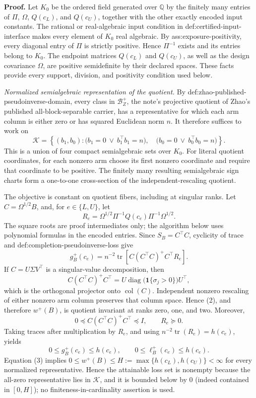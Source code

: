 \textbf{Proof.}
Let \(K_0\) be the ordered field generated over \(\mathbb Q\) by the finitely many entries of \(\Pi\), \(\Omega\), \(Q(c_L)\), and \(Q(c_U)\), together with the other exactly encoded input constants.  The rational or real-algebraic input condition in def:certified-input-interface makes every element of \(K_0\) real algebraic.  By ass:exposure-positivity, every diagonal entry of \(\Pi\) is strictly positive.  Hence \(\Pi^{-1}\) exists and its entries belong to \(K_0\).  The endpoint matrices \(Q(c_L)\) and \(Q(c_U)\), as well as the design covariance \(\Omega\), are positive semidefinite by their declared spaces.  These facts provide every support, division, and positivity condition used below.

\emph{Normalized semialgebraic representation of the quotient.}
By def:zhao-published-pseudoinverse-domain, every class in \(\mathcal B_Z^+\), the note's projective quotient of Zhao's published all-block-separable carrier, has a representative for which each arm column is either zero or has squared Euclidean norm \(n\).  It therefore suffices to work on
\[
\mathcal K=
\left\{(b_1,b_0):
\bigl(b_1=0\ \vee\ b_1^{\top}b_1=n\bigr),\quad
\bigl(b_0=0\ \vee\ b_0^{\top}b_0=n\bigr)
\right\}.
\tag{1}
\]
This is a union of four compact semialgebraic sets over \(K_0\).  For literal quotient coordinates, for each nonzero arm choose its first nonzero coordinate and require that coordinate to be positive.  The finitely many resulting semialgebraic sign charts form a one-to-one cross-section of the independent-rescaling quotient.

The objective is constant on quotient fibers, including at singular ranks.  Let \(C=\Omega^{1/2}B\), and, for \(e\in\{L,U\}\), let
\[
R_e=\Omega^{1/2}\Pi^{-1}Q(c_e)\Pi^{-1}\Omega^{1/2}.
\]
The square roots are proof intermediates only; the algorithm below uses polynomial formulas in the encoded entries.  Since \(S_B=C^{\top}C\), cyclicity of trace and def:completion-pseudoinverse-loss give
\[
g_B^+(c_e)
=n^{-2}\operatorname{tr}\!\left[
C(C^{\top}C)^+C^{\top}R_e
\right].
\tag{2}
\]
If \(C=U\Sigma V^{\top}\) is a singular-value decomposition, then
\[
C(C^{\top}C)^+C^{\top}
=U\operatorname{diag}\!\bigl(\mathbf 1\{\sigma_j>0\}\bigr)U^{\top},
\]
which is the orthogonal projector onto \(\operatorname{col}(C)\).  Independent nonzero rescaling of either nonzero arm column preserves that column space.  Hence (2), and therefore \(w^+(B)\), is quotient invariant at ranks zero, one, and two.  Moreover,
\[
0\preceq C(C^{\top}C)^+C^{\top}\preceq I,
\qquad R_e\succeq0.
\]
Taking traces after multiplication by \(R_e\), and using \(n^{-2}\operatorname{tr}(R_e)=h(c_e)\), yields
\[
0\le g_B^+(c_e)\le h(c_e),
\qquad
0\le \ell_B^+(c_e)\le h(c_e).
\tag{3}
\]
Equation (3) implies \(0\le w^+(B)\le H:=\max\{h(c_L),h(c_U)\}<\infty\) for every normalized representative.  Hence the attainable loss set is nonempty because the all-zero representative lies in \(\mathcal K\), and it is bounded below by \(0\) (indeed contained in \([0,H]\)); no finiteness-in-cardinality assertion is used.

